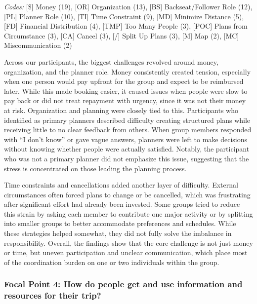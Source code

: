 \documentclass[12pt,a4paper]{article}
\begin{document}
\textit{Codes:} [\$] Money (19), [OR] Organization (13), [BS] Backseat/Follower Role (12), [PL] Planner Role (10), [TI] Time Constraint (9), [MD] Minimize Distance (5), [FD] Financial Distribution (4), [TMP] Too Many People (3), [POC] Plans from Circumstance (3), [CA] Cancel (3), [/] Split Up Plans (3), [M] Map (2), [MC] Miscommunication (2)

\vspace{6pt}

Across our participants, the biggest challenges revolved around money, organization, and the planner role. Money consistently created tension, especially when one person would pay upfront for the group and expect to be reimbursed later. While this made booking easier, it caused issues when people were slow to pay back or did not treat repayment with urgency, since it was not their money at risk. Organization and planning were closely tied to this. Participants who identified as primary planners described difficulty creating structured plans while receiving little to no clear feedback from others. When group members responded with “I don’t know” or gave vague answers, planners were left to make decisions without knowing whether people were actually satisfied. Notably, the participant who was not a primary planner did not emphasize this issue, suggesting that the stress is concentrated on those leading the planning process.

\vspace{6pt}

Time constraints and cancellations added another layer of difficulty. External circumstances often forced plans to change or be cancelled, which was frustrating after significant effort had already been invested. Some groups tried to reduce this strain by asking each member to contribute one major activity or by splitting into smaller groups to better accommodate preferences and schedules. While these strategies helped somewhat, they did not fully solve the imbalance in responsibility. Overall, the findings show that the core challenge is not just money or time, but uneven participation and unclear communication, which place most of the coordination burden on one or two individuals within the group.

\subsubsection{Focal Point 4: How do people get and use information and resources for their trip?}
\end{document}
